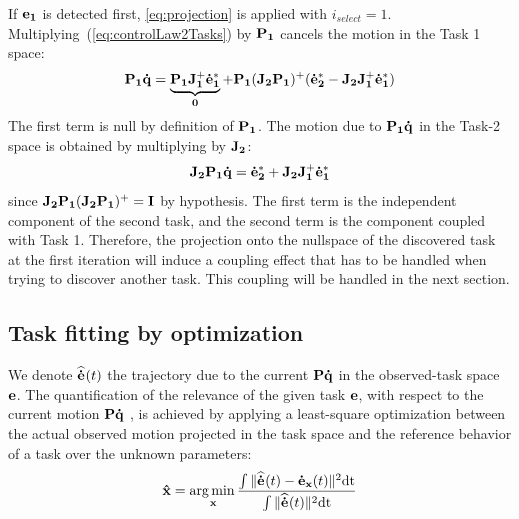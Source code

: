\documentclass[letterpaper, 10pt, conference]{ieeeconf}      %
\begin{document}
If ${\mathbf{e_1}}$ is detected first, \eqref{eq:projection} is applied with
$i_{select} = 1$. Multiplying~(\ref{eq:controlLaw2Tasks}) by ${\mathbf{P_1}}$
cancels the motion in the Task 1 space:
\begin{equation}
  {\mathbf{P_1}} {\mathbf{\dot{q}}} = \underbrace{{\mathbf{P_1}} {\mathbf{J_1^+}}{\mathbf{\dot{e}_1^*}}}_{{\mathbf{0}}} + {\mathbf{P_1}} ({\mathbf{J_2}}{\mathbf{P_1}})^+ ({\mathbf{\dot{e}_2^*}} - {\mathbf{J_2}}{\mathbf{J_1^+}}{\mathbf{\dot{e}_1^*}})  
  \label{eq:cancel1_2:1}
\end{equation}
The first term is null by definition of ${\mathbf{P_1}}$.
The motion due to ${\mathbf{P_1}} {\mathbf{\dot{q}}}$ in the Task-2 space is obtained by multiplying by ${\mathbf{J_2}}$:
\begin{equation}
  {\mathbf{J_2}} {\mathbf{P_1}} {\mathbf{\dot{q}}} = {\mathbf{\dot{e}_2^*}} +
  {\mathbf{J_2}}  {\mathbf{J_1^+}} {\mathbf{\dot{e}_1^*}}  
  \label{eq:J2P1q}
\end{equation}
since ${\mathbf{J_2}}{\mathbf{P_1}}({\mathbf{J_2}}{\mathbf{P_1}})^+ = {\mathbf{I}}$ by hypothesis.
The first term is the
independent component of the second task, and the second term
is the component coupled with Task 1. 
Therefore, the projection onto the nullspace of the discovered task  at the 
first iteration will induce a coupling effect that has to be handled when trying to discover another task.
This coupling will be handled in the next section.


\newcommand{\medot}[1]{\mbf{\dot{e}}_{#1}}
\newcommand{\mqdot}{\mbf{\dot{q}}}
\newcommand{\mP}[1]{\mbf{P}_{#1}}
\newcommand{\mJ}[1]{\mbf{J}_{#1}}
\newcommand{\mJp}[1]{\mbf{J}_{#1}^+}
\newcommand{\medotc}[1]{\medot{#1}^*}
\newcommand{\medoth}[1]{\mbf{\widehat{\dot{e}}}_{#1}}
\newcommand{\medothp}[2]{\medoth{#1|#2}}

\subsection{Task fitting by optimization} \label{sec:alg2:proj}
We denote $\medoth{}(t)$ the trajectory due to the current ${\mathbf{P}}
{\mathbf{\dot{q}}}$ in the observed-task space ${\mathbf{e}}$.  The quantification of the
relevance of the given task ${\mathbf{e}}$, with respect to the current motion
${\mathbf{P}} {\mathbf{\dot{q}}}$ , is achieved by applying a least-square
optimization between the actual observed motion projected in the task space and
the reference behavior of a task over the unknown parameters:
\begin{equation}
  \mbf{\hat x} = \underset{\mbf{x}}\argmin \frac{\int \Vert \medoth{}(t) - \medot{\mbf x}(t) \Vert^2 \mathrm{dt}}{\int \Vert \medoth{}(t) \Vert^2 \mathrm{dt}}
\label{optimProblem}
\end{equation}
\end{document}
